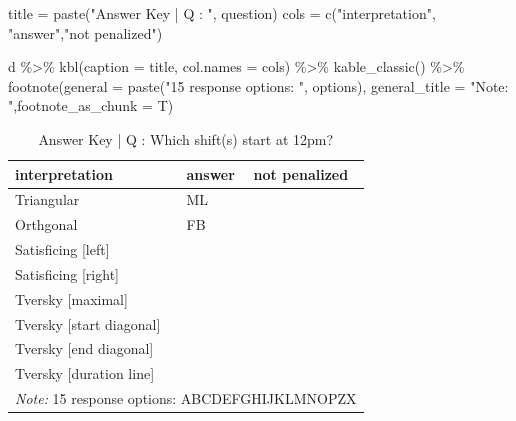 \documentclass[
  letterpaper,
  DIV=11,
  numbers=noendperiod]{scrreprt}
\newenvironment{Shaded}{\begin{snugshade}}{\end{snugshade}}
\newcommand{\AttributeTok}[1]{\textcolor[rgb]{0.40,0.45,0.13}{#1}}
\newcommand{\FunctionTok}[1]{\textcolor[rgb]{0.28,0.35,0.67}{#1}}
\newcommand{\NormalTok}[1]{\textcolor[rgb]{0.00,0.23,0.31}{#1}}
\newcommand{\OtherTok}[1]{\textcolor[rgb]{0.00,0.23,0.31}{#1}}
\newcommand{\SpecialCharTok}[1]{\textcolor[rgb]{0.37,0.37,0.37}{#1}}
\newcommand{\StringTok}[1]{\textcolor[rgb]{0.13,0.47,0.30}{#1}}
\begin{document}
\begin{Shaded}
\begin{Highlighting}[]
\NormalTok{title }\OtherTok{=} \FunctionTok{paste}\NormalTok{(}\StringTok{"Answer Key | Q : "}\NormalTok{, question)}
\NormalTok{cols }\OtherTok{=} \FunctionTok{c}\NormalTok{(}\StringTok{"interpretation"}\NormalTok{, }\StringTok{"answer"}\NormalTok{,}\StringTok{"not penalized"}\NormalTok{)}

\NormalTok{d }\SpecialCharTok{\%\textgreater{}\%} \FunctionTok{kbl}\NormalTok{(}\AttributeTok{caption =}\NormalTok{ title, }\AttributeTok{col.names =}\NormalTok{ cols) }\SpecialCharTok{\%\textgreater{}\%} \FunctionTok{kable\_classic}\NormalTok{() }\SpecialCharTok{\%\textgreater{}\%}
  \FunctionTok{footnote}\NormalTok{(}\AttributeTok{general =} \FunctionTok{paste}\NormalTok{(}\StringTok{"15 response options: "}\NormalTok{, options), }\AttributeTok{general\_title =} \StringTok{"Note: "}\NormalTok{,}\AttributeTok{footnote\_as\_chunk =}\NormalTok{ T)}
\end{Highlighting}
\end{Shaded}

\begin{table}

\caption{Answer Key | Q :  Which shift(s) start at 12pm?}
\centering
\begin{tabular}[t]{l|l|l}
\hline
interpretation & answer & not penalized\\
\hline
Triangular & ML & \\
\hline
Orthgonal & FB & \\
\hline
Satisficing [left] &  & \\
\hline
Satisficing [right] &  & \\
\hline
Tversky [maximal] &  & \\
\hline
Tversky [start diagonal] &  & \\
\hline
Tversky [end diagonal] &  & \\
\hline
Tversky [duration line] &  & \\
\hline
\multicolumn{3}{l}{\rule{0pt}{1em}\textit{Note: } 15 response options:  ABCDEFGHIJKLMNOPZX}\\
\end{tabular}
\end{table}
\end{document}
